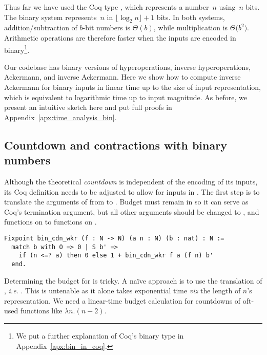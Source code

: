 
Thus far we have used the Coq type , which represents 
a number~$n$ using~$n$ bits. 
The binary system represents~$n$ in $\lfloor \log_{2} n \rfloor + 1$ bits.
In both systems, addition/subtraction of $b$-bit 
numbers is $\Theta(b)$, while multiplication is $\Theta \big(b^2\big)$. 
Arithmetic operations are therefore faster when the inputs 
are encoded in binary\footnote{We put a further explanation of 
Coq's binary type  in Appendix~\ref{apx:bin_in_coq}.}.

Our codebase has binary versions of hyperoperations, inverse hyperoperations, 
Ackermann, and inverse Ackermann. 
Here we show how to compute inverse Ackermann for binary inputs in 
linear time up to the size of input representation, 
which is equivalent to logarithmic time up to input magnitude.
As before, we present an intuitive sketch here and put 
full proofs in Appendix~\ref{apx:time_analysis_bin}.

\subsection{Countdown and contractions with binary numbers}

Although the theoretical \emph{countdown} is independent of the encoding 
of its inputs, its Coq definition needs to be adjusted to allow for inputs 
in . The first step is to translate the arguments of 
 from  to . Budget  must 
remain in  so it can serve as Coq's termination argument, 
but all other  arguments should be changed 
to , and functions on  to functions on .
\begin{lstlisting}
Fixpoint bin_cdn_wkr (f : N -> N) (a n : N) (b : nat) : N :=
  match b with O => 0 | S b' => 
    if (n <=? a) then 0 else 1 + bin_cdn_wkr f a (f n) b'
  end.
\end{lstlisting}

Determining the budget for  is tricky. 
A naïve approach is to use the  translation of , 
\emph{i.e.} . This is untenable as it alone 
takes exponential time \emph{viz} the length of $n$'s representation.
We need a linear-time budget calculation for countdowns 
of oft-used functions like $\lambda n.(n-2)$.

